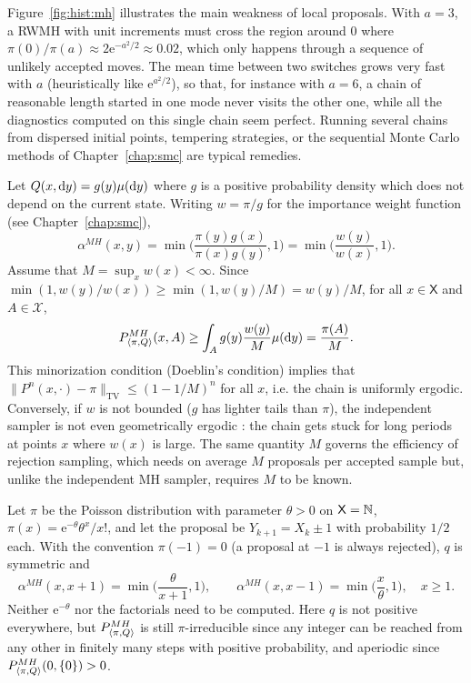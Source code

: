 \documentclass[english,graybox,envcountchap,envcountsame,sectrefs,shortlabels]{svmono}
\theoremstyle{style}
\newcommand{\rme}{\mathrm{e}}
\newcommand{\eqsp}{}
\newcommand{\Xset}{\mathsf{X}}
\newcommand{\Xsigma}{\mathcal{X}}
\begin{document}
\begin{example}[Multimodality]
Figure~\ref{fig:hist:mh} illustrates the main weakness of local proposals. With $a=3$, a RWMH with unit increments must cross the region around $0$ where $\pi(0)/\pi(a)\approx 2\rme^{-a^2/2}\approx 0.02$, which only happens through a sequence of unlikely accepted moves. The mean time between two switches grows very fast with $a$ (heuristically like $\rme^{a^2/2}$), so that, for instance with $a=6$, a chain of reasonable length started in one mode never visits the other one, while all the diagnostics computed on this single chain seem perfect. Running several chains from dispersed initial points, tempering strategies, or the sequential Monte Carlo methods of Chapter~\ref{chap:smc} are typical remedies.
\end{example}

\begin{example}
\label{ex:indep:mh}
Let $Q(x,\mathrm{d} y) = g(y)\mu(\mathrm{d} y)$ where $g$ is a positive probability density which does not depend on the current state. Writing $w = \pi/g$ for the importance weight function (see Chapter~\ref{chap:smc}),
$$
\alpha^{MH}(x,y) = \min\Big(\frac{\pi(y)g(x)}{\pi(x)g(y)},1\Big) = \min\Big(\frac{w(y)}{w(x)},1\Big)\eqsp.
$$
Assume that $M = \sup_x w(x)<\infty$. Since $\min(1,w(y)/w(x))\geq \min(1,w(y)/M) = w(y)/M$, for all $x\in\Xset$ and $A\in\Xsigma$,
$$
\mh{\pi,Q}(x,A)\geq\int_A g(y)\frac{w(y)}{M}\mu(\rmd y) = \frac{\pi(A)}{M}\eqsp.
$$
This minorization condition (Doeblin's condition) implies that $\|P^n(x,\cdot)-\pi\|_{\mathrm{TV}}\leq(1-1/M)^n$ for all $x$, i.e. the chain is uniformly ergodic. Conversely, if $w$ is not bounded ($g$ has lighter tails than $\pi$), the independent sampler is not even geometrically ergodic \cite{mengersen1996rates}: the chain gets stuck for long periods at points $x$ where $w(x)$ is large. The same quantity $M$ governs the efficiency of rejection sampling, which needs on average $M$ proposals per accepted sample but, unlike the independent MH sampler, requires $M$ to be known.
\end{example}

\begin{example}
Let $\pi$ be the Poisson distribution with parameter $\theta>0$ on $\Xset=\nset$, $\pi(x) = \rme^{-\theta}\theta^x/x!$, and let the proposal be $Y_{k+1} = X_k\pm1$ with probability $1/2$ each. With the convention $\pi(-1)=0$ (a proposal at $-1$ is always rejected), $q$ is symmetric and
$$
\alpha^{MH}(x,x+1) = \min\Big(\frac{\theta}{x+1},1\Big)\eqsp,\qquad \alpha^{MH}(x,x-1) = \min\Big(\frac{x}{\theta},1\Big)\eqsp,\quad x\geq 1\eqsp.
$$
Neither $\rme^{-\theta}$ nor the factorials need to be computed. Here $q$ is not positive everywhere, but $P_{\langle\pi,Q\rangle}^{MH}$ is still $\pi$-irreducible since any integer can be reached from any other in finitely many steps with positive probability, and aperiodic since $P_{\langle\pi,Q\rangle}^{MH}(0,\{0\})>0$.
\end{example}
\end{document}
